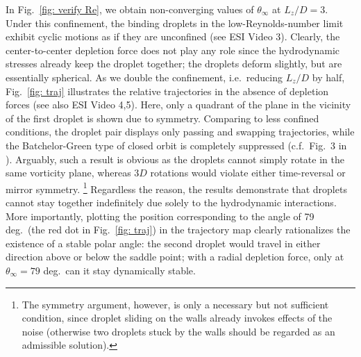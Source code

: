 In Fig.\ \ref{fig: verify Re}, we obtain non-converging values of $\theta_\infty$ at $L_z/D=3$. Under this confinement, the binding droplets in the low-Reynolds-number limit exhibit cyclic motions as if they are unconfined (see ESI Video 3). Clearly, the center-to-center depletion force does not play any role since the hydrodynamic stresses already keep the droplet together; the droplets deform slightly, but are essentially spherical. As we double the confinement, i.e.\ reducing $L_z/D$ by half, Fig.\ \ref{fig: traj} illustrates the relative trajectories in the absence of depletion forces (see also ESI Video 4,5). Here, only a quadrant of the plane in the vicinity of the first droplet is shown due to symmetry. Comparing to less confined conditions, the droplet pair displays only passing and swapping trajectories, while the Batchelor-Green type of closed orbit is completely suppressed (c.f.\ Fig.\ 3 in \citep{zurita-gotor_2007}). Arguably, such a result is obvious as the droplets cannot simply rotate in the same vorticity plane, whereas $3D$ rotations would violate either time-reversal or mirror symmetry. \footnote{The symmetry argument, however, is only a necessary but not sufficient condition, since droplet sliding on the walls already invokes effects of the noise (otherwise two droplets stuck by the walls should be regarded as an admissible solution).} Regardless the reason, the results demonstrate that droplets cannot stay together indefinitely due solely to the hydrodynamic interactions. More importantly, plotting the position corresponding to the angle of 79 deg.\ (the red dot in Fig.\ \ref{fig: traj}) in the trajectory map clearly rationalizes the existence of a stable polar angle: the second droplet would travel in either direction above or below the saddle point; with a radial depletion force, only at $\theta_\infty=79$ deg.\ can it stay dynamically stable.



